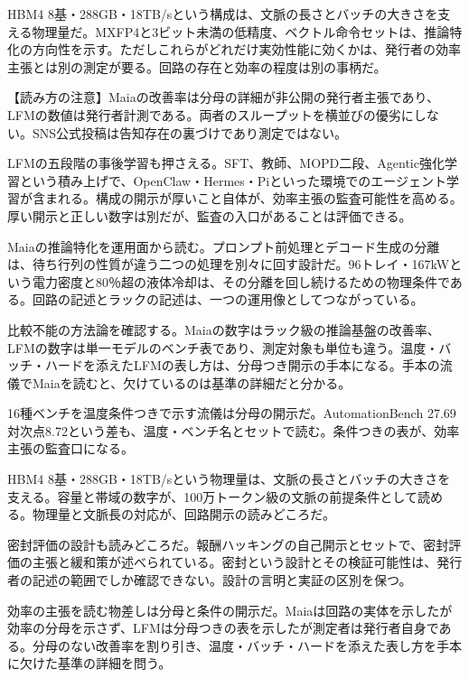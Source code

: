\documentclass[lualatex,a4paper,10pt]{jlreq}
\begin{document}
HBM4 8基・288GB・18TB/sという構成は、文脈の長さとバッチの大きさを支える物理量だ。MXFP4と3ビット未満の低精度、ベクトル命令セットは、推論特化の方向性を示す。ただしこれらがどれだけ実効性能に効くかは、発行者の効率主張とは別の測定が要る。回路の存在と効率の程度は別の事柄だ。
\cite{B09,B10}


\begin{tcolorbox}[colback=SurveySoft,colframe=SurveyRule,arc=1mm,boxrule=0.4pt,left=2mm,right=2mm]
【読み方の注意】Maiaの改善率は分母の詳細が非公開の発行者主張であり、LFMの数値は発行者計測である。両者のスループットを横並びの優劣にしない。SNS公式投稿は告知存在の裏づけであり測定ではない。
\end{tcolorbox}
\cite{B09,B11,B12,B10}


LFMの五段階の事後学習も押さえる。SFT、教師、MOPD二段、Agentic強化学習という積み上げで、OpenClaw・Hermes・Piといった環境でのエージェント学習が含まれる。構成の開示が厚いこと自体が、効率主張の監査可能性を高める。厚い開示と正しい数字は別だが、監査の入口があることは評価できる。
\cite{B11,B12}


Maiaの推論特化を運用面から読む。プロンプト前処理とデコード生成の分離は、待ち行列の性質が違う二つの処理を別々に回す設計だ。96トレイ・167kWという電力密度と80％超の液体冷却は、その分離を回し続けるための物理条件である。回路の記述とラックの記述は、一つの運用像としてつながっている。
\cite{B09,B10}


比較不能の方法論を確認する。Maiaの数字はラック級の推論基盤の改善率、LFMの数字は単一モデルのベンチ表であり、測定対象も単位も違う。温度・バッチ・ハードを添えたLFMの表し方は、分母つき開示の手本になる。手本の流儀でMaiaを読むと、欠けているのは基準の詳細だと分かる。
\cite{B09,B11,B12,B10}


16種ベンチを温度条件つきで示す流儀は分母の開示だ。AutomationBench 27.69対次点8.72という差も、温度・ベンチ名とセットで読む。条件つきの表が、効率主張の監査口になる。
\cite{B11,B12}


HBM4 8基・288GB・18TB/sという物理量は、文脈の長さとバッチの大きさを支える。容量と帯域の数字が、100万トークン級の文脈の前提条件として読める。物理量と文脈長の対応が、回路開示の読みどころだ。
\cite{B09,B10}


密封評価の設計も読みどころだ。報酬ハッキングの自己開示とセットで、密封評価の主張と緩和策が述べられている。密封という設計とその検証可能性は、発行者の記述の範囲でしか確認できない。設計の言明と実証の区別を保つ。
\cite{B11,B12}


効率の主張を読む物差しは分母と条件の開示だ。Maiaは回路の実体を示したが効率の分母を示さず、LFMは分母つきの表を示したが測定者は発行者自身である。分母のない改善率を割り引き、温度・バッチ・ハードを添えた表し方を手本に欠けた基準の詳細を問う。
\cite{B09,B11,B12,B10}
\end{document}
